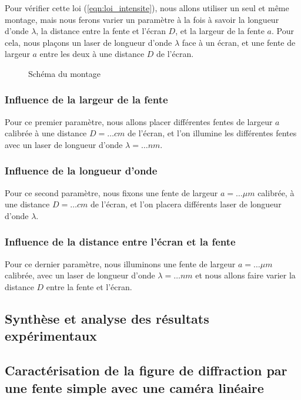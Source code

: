 \documentclass[12pt]{article}
\begin{document}
Pour vérifier cette loi (\ref{eqn:loi_intensite}), nous allons utiliser un seul et même montage, mais nous ferons varier un paramètre à la fois à savoir la longueur d'onde $\lambda$, la distance entre la fente et l'écran $D$, 
et la largeur de la fente $a$. Pour cela, nous plaçons un laser de longueur d'onde $\lambda$ face à un écran, et une fente de largeur $a$ entre les deux à une distance $D$ de l'écran.

\begin{figure}[!h]
    \begin{center}
        \resizebox{0.7\textwidth}{5cm}{
        
        }
    \end{center}
    \caption{Schéma du montage}
\end{figure}

\subsubsection{Influence de la largeur de la fente}
Pour ce premier paramètre, nous allons placer différentes fentes de largeur $a$ calibrée à une distance $D = \dots cm$ de l'écran, et l'on illumine les différentes fentes avec un laser de longueur d'onde
$\lambda = \dots nm$. 

\subsubsection{Influence de la longueur d'onde}
Pour ce second paramètre, nous fixons une fente de largeur $a = \dots \mu m$ calibrée, à une distance $D = \dots cm$ de l'écran, et l'on placera différents laser de longueur d'onde $\lambda$.

\subsubsection{Influence de la distance entre l'écran et la fente}
Pour ce dernier paramètre, nous illuminons une fente de largeur $a = \dots \mu m$ calibrée, avec un laser de longueur d'onde $\lambda = \dots nm$ et nous allons faire varier la distance $D$ entre la fente et l'écran.

\subsection{Synthèse et analyse des résultats expérimentaux}

\break
\subsection{Caractérisation de la figure de diffraction par une fente simple avec une caméra linéaire}
\end{document}
